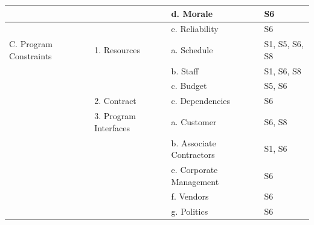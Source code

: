 \documentclass[
	12pt,
	openright,
	twoside,
	a4paper,
	english,
	brazil
	]{abntex2}
\begin{document}
\begin{longtable}{|>{\raggedright\arraybackslash}p{2.4cm}|p{4.5cm}|p{4.7cm}|l|}
  \cline{3-4}
  & & d. Morale & S6 \\
  \cline{3-4}
  & & e. Reliability & S6 \\
  \hline
  C. Program Constraints & 1. Resources & a. Schedule & S1, S5, S6, S8 \\
  \cline{3-4}
  & & b. Staff & S1, S6, S8 \\
  \cline{3-4}
  & & c. Budget & S5, S6 \\
  \cline{2-4}
  & 2. Contract & c. Dependencies & S6 \\
  \cline{2-4}
  & 3. Program Interfaces & a. Customer & S6, S8 \\
  \cline{3-4}
  & & b. Associate Contractors & S1, S6 \\
  \cline{3-4}
  & & e. Corporate Management & S6 \\
  \cline{3-4}
  & & f. Vendors & S6 \\
  \cline{3-4}
  & & g. Politics & S6 \\
  \hline
\end{longtable}



\printindex

\end{document}
